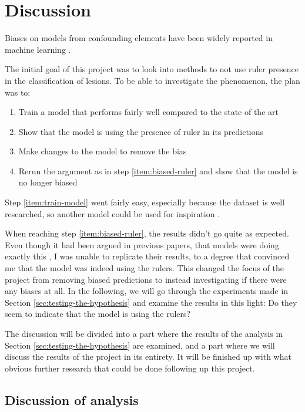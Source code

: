 \chapter{Discussion}
Biases on models from confounding elements have been widely reported in machine learning
\cite{DeConstructing_Bias_on_Skin_Lesion_Datasets_2019, Towards_Explainable_Classifiers_Using_the_Counterfactual_Approach_2019, debias-not-so-fast, interps-are-useful}.

The initial goal of this project was to look into methods to not use ruler presence in the
classification of lesions.
To be able to investigate the phenomenon, the plan was to:
\begin{enumerate}
    \item Train a model that performs fairly well compared to the state of the art \label{item:train-model}
    \item Show that the model is using the presence of ruler in its predictions \label{item:biased-ruler}
    \item Make changes to the model to remove the bias
    \item Rerun the argument as in step \ref{item:biased-ruler} and show that the model is no longer biased
\end{enumerate}
Step \ref{item:train-model} went fairly easy, especially because the dataset is well researched,
so another model could be used for inspiration \cite{kaggle-97-model}.

When reaching step \ref{item:biased-ruler}, the results didn't go quite as expected.
Even though it had been argued in previous papers, that models were doing exactly this
\cite{debias-not-so-fast,interps-are-useful}, I was unable to replicate their results,
to a degree that convinced me that the model was indeed using the rulers.
This changed the focus of the project from removing biased predictions to instead investigating
if there were any biases at all.
In the following, we will go through the experiments made in Section \ref{sec:testing-the-hypothesis} and
examine the results in this light: Do they seem to indicate that the model is using the rulers?

The discussion will be divided into a part where the results of the analysis in Section \ref{sec:testing-the-hypothesis}
are examined, and a part where we will discuss the results of the project in its entirety.
It will be finished up with what obvious further research that could be done following up this project.

\section{Discussion of analysis}
